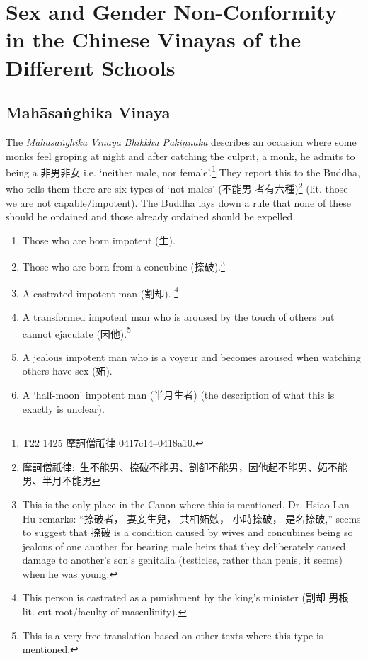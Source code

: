 \section{Sex and Gender Non-Conformity in the Chinese Vinayas of the Different Schools}
\label{appendix1}

\subsection{Mahāsaṅghika Vinaya}
The {\em Mahāsaṅghika} {\em Vinaya} {\em Bhikkhu Pakiṇṇaka} describes an occasion where some monks feel groping at night and after catching the culprit, a monk, he admits to being a 非男非女 i.e. `neither male, nor female'.\footnote{T22 1425 摩訶僧祇律 0417c14–0418a10.} They report this to the Buddha, who tells them there are six types of `not males' (不能男 者有六種)\footnote{摩訶僧祇律: 生不能男、捺破不能男、割卻不能男，因他起不能男、妬不能男、半月不能男} (lit. those we are not capable/impotent). The Buddha lays down a rule that none of these should be ordained and those already ordained should be expelled.

\begin{enumerate}
\item Those who are born impotent (生). 
\item Those who are born from a concubine (捺破).\footnote{This is the only place in the Canon where this is mentioned. Dr. Hsiao-Lan Hu remarks: ``捺破者， 妻妾生兒， 共相妬嫉， 小時捺破， 是名捺破,'' seems to suggest that 捺破 is a condition caused by wives and concubines being so jealous of one another for bearing male heirs that they deliberately caused damage to another's son's genitalia (testicles, rather than penis, it seems) when he was young.} 
\item A castrated impotent man (割却). \footnote{This person is castrated as a punishment by the king's minister (割却 男根 lit. cut root/faculty of masculinity).}
\item A transformed impotent man who is aroused by the touch of others but cannot ejaculate (因他).\footnote{This is a very free translation based on other texts where this type is mentioned.}
\item A jealous impotent man who is a voyeur and becomes aroused when watching others have sex (妬).
\item A `half-moon' impotent man (半月生者) (the description of what this is exactly is unclear).
\end{enumerate}

